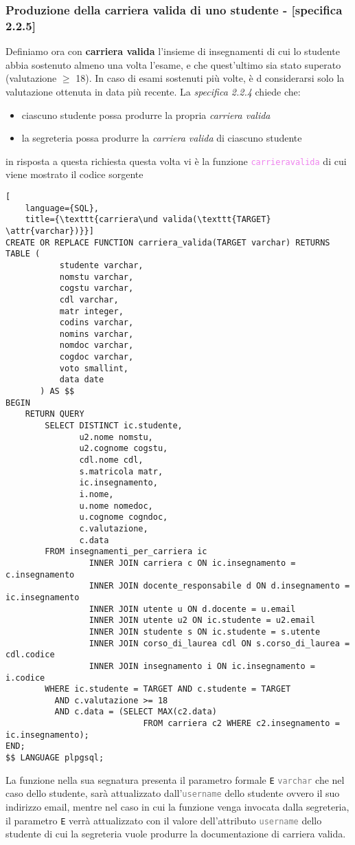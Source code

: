 \documentclass{article}
\newcommand{\attr}[1]{\texttt{\textcolor{gray}{#1}}}
\newcommand{\sqlfunc}[1]{\texttt{\textcolor{violet}{#1}}}
\newcommand{\und}[0]{\textunderscore}
\begin{document}
\subsubsection{Produzione della carriera valida di uno studente - [specifica 2.2.5]}
Definiamo ora con \textbf{carriera valida} l'insieme di insegnamenti di cui lo studente abbia sostenuto almeno una volta l'esame, e che quest'ultimo sia stato superato (valutazione $\geq$ 18). In caso di esami sostenuti più volte, è d considerarsi solo la valutazione ottenuta in data più recente.
La \textit{specifica 2.2.4} chiede che:
\begin{itemize}
    \item ciascuno studente possa produrre la propria \textit{carriera valida}
    \item la segreteria possa produrre la \textit{carriera valida} di ciascuno studente
\end{itemize}
in risposta a questa richiesta questa volta vi è la funzione \sqlfunc{carriera\und valida} di cui viene mostrato il codice sorgente
\begin{lstlisting}[
    language={SQL},
    title={\texttt{carriera\und valida(\texttt{TARGET} \attr{varchar})}}]
CREATE OR REPLACE FUNCTION carriera_valida(TARGET varchar) RETURNS TABLE (
           studente varchar,
           nomstu varchar,
           cogstu varchar,
           cdl varchar,
           matr integer,
           codins varchar,
           nomins varchar,
           nomdoc varchar,
           cogdoc varchar,
           voto smallint,
           data date
       ) AS $$
BEGIN
    RETURN QUERY
        SELECT DISTINCT ic.studente,
               u2.nome nomstu,
               u2.cognome cogstu,
               cdl.nome cdl,
               s.matricola matr,
               ic.insegnamento,
               i.nome,
               u.nome nomedoc,
               u.cognome cogndoc,
               c.valutazione,
               c.data
        FROM insegnamenti_per_carriera ic
                 INNER JOIN carriera c ON ic.insegnamento = c.insegnamento
                 INNER JOIN docente_responsabile d ON d.insegnamento = ic.insegnamento
                 INNER JOIN utente u ON d.docente = u.email
                 INNER JOIN utente u2 ON ic.studente = u2.email
                 INNER JOIN studente s ON ic.studente = s.utente
                 INNER JOIN corso_di_laurea cdl ON s.corso_di_laurea = cdl.codice
                 INNER JOIN insegnamento i ON ic.insegnamento = i.codice
        WHERE ic.studente = TARGET AND c.studente = TARGET
          AND c.valutazione >= 18
          AND c.data = (SELECT MAX(c2.data)
                            FROM carriera c2 WHERE c2.insegnamento = ic.insegnamento);
END;
$$ LANGUAGE plpgsql;
\end{lstlisting}
La funzione nella sua segnatura presenta il parametro formale \texttt{E} \attr{varchar} che nel caso dello studente, sarà attualizzato dall'\attr{username} dello studente ovvero il suo indirizzo email, mentre nel caso in cui la funzione venga invocata dalla segreteria, il parametro \texttt{E} verrà attualizzato con il valore dell'attributo \attr{username} dello studente di cui la segreteria vuole produrre la documentazione di carriera valida.
\end{document}
